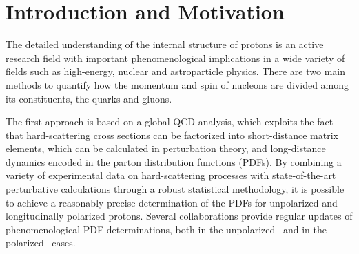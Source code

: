 \section{Introduction and Motivation}

The detailed understanding of the internal structure of protons is an active
research field with important phenomenological implications in a wide variety 
of fields such as high-energy, nuclear and astroparticle physics.
%
There are two main methods to quantify how the momentum and spin of nucleons
are divided among its constituents, the quarks and gluons.

The first approach is based on a global QCD analysis, which exploits the fact 
that hard-scattering cross sections can be factorized into short-distance 
matrix elements, which can be calculated in perturbation theory, 
and long-distance dynamics encoded in the parton distribution functions (PDFs).
%
By combining a variety of experimental data on hard-scattering processes
with state-of-the-art perturbative calculations through a robust statistical
methodology, it is possible to achieve a reasonably precise determination
of the PDFs for unpolarized and longitudinally polarized protons.
%
Several collaborations provide regular updates of
phenomenological PDF determinations, both
in the unpolarized~\cite{Ball:2012cx,Ball:2014uwa,Harland-Lang:2014zoa,
Dulat:2015mca,Alekhin:2017kpj,Owens:2012bv} and in
the polarized~\cite{Nocera:2014gqa,deFlorian:2009vb} cases.

